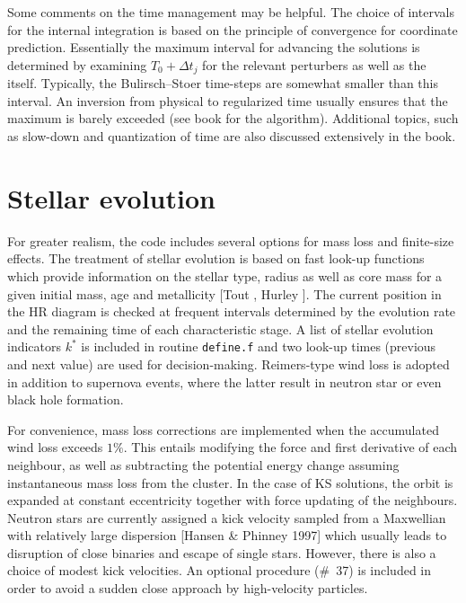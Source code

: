 \documentclass[12pt]{article}
\begin{document}
Some comments on the time management may be helpful.
The choice of intervals for the internal integration is based on the
principle of convergence for coordinate prediction.
Essentially the maximum interval for advancing the solutions is determined
by examining $T_0 + {\Delta t}_j$ for the relevant perturbers as well as the
\cm itself.
Typically, the Bulirsch--Stoer time-steps are somewhat smaller than this
interval.
An inversion from physical to regularized time usually ensures that the
maximum is barely exceeded (see book for the algorithm).
Additional topics, such as slow-down and quantization of time are also
discussed extensively in the book.

\section{Stellar evolution}

For greater realism, the code includes several options for mass loss and
finite-size effects.
The treatment of stellar evolution is based on fast look-up functions
which provide information on the stellar type, radius as well as core mass
for a given initial mass, age and metallicity [Tout ,
Hurley ].
The current position in the HR diagram is checked at frequent intervals
determined by the evolution rate and the remaining time of each
characteristic stage.
A list of stellar evolution indicators $k^{\ast}$ is included in routine
{\tt define.f} and two look-up times (\ie previous and next value) are used
for decision-making.
Reimers-type wind loss is adopted in addition to supernova events, where the
latter result in neutron star or even black hole formation.

For convenience, mass loss corrections are implemented when the accumulated
wind loss exceeds $1\%$.
This entails modifying the force and first derivative of each neighbour, as
well as subtracting the potential energy change assuming instantaneous mass
loss from the cluster.
In the case of KS solutions, the orbit is expanded at constant eccentricity
together with force updating of the \cm neighbours.
Neutron stars are currently assigned a kick velocity sampled from a
Maxwellian with relatively large dispersion [\cf Hansen \& Phinney 1997]
which usually leads to disruption of close binaries and escape of single
stars.
However, there is also a choice of modest kick velocities.
An optional procedure (\#~37) is included in order to avoid a sudden close
approach by high-velocity particles.
\end{document}
